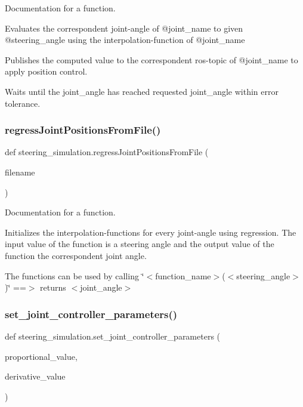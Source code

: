 Documentation for a function. 

Evaluates the correspondent joint-\/angle of @joint\+\_\+name to given @steering\+\_\+angle using the interpolation-\/function of @joint\+\_\+name

Publishes the computed value to the correspondent ros-\/topic of @joint\+\_\+name to apply position control.

Waits until the joint\+\_\+angle has reached requested joint\+\_\+angle within error tolerance. \mbox{\label{namespacesteering__simulation_a3bdf7d63620ec8e0a63d41324b1cdaa4}} 
\subsubsection{\texorpdfstring{regressJointPositionsFromFile()}{regressJointPositionsFromFile()}}
{\footnotesize\ttfamily def steering\+\_\+simulation.\+regress\+Joint\+Positions\+From\+File (\begin{DoxyParamCaption}\item[{}]{filename }\end{DoxyParamCaption})}



Documentation for a function. 

Initializes the interpolation-\/functions for every joint-\/angle using regression. The input value of the function is a steering angle and the output value of the function the correspondent joint angle.

The functions can be used by calling \char`\"{}$<$function\+\_\+name$>$($<$steering\+\_\+angle$>$)\char`\"{} ==$>$ returns $<$joint\+\_\+angle$>$ \mbox{\label{namespacesteering__simulation_a787fcfa65451a11a9f94afaea6a6e809}} 
\subsubsection{\texorpdfstring{set\_joint\_controller\_parameters()}{set\_joint\_controller\_parameters()}}
{\footnotesize\ttfamily def steering\+\_\+simulation.\+set\+\_\+joint\+\_\+controller\+\_\+parameters (\begin{DoxyParamCaption}\item[{}]{proportional\+\_\+value,  }\item[{}]{derivative\+\_\+value }\end{DoxyParamCaption})}




